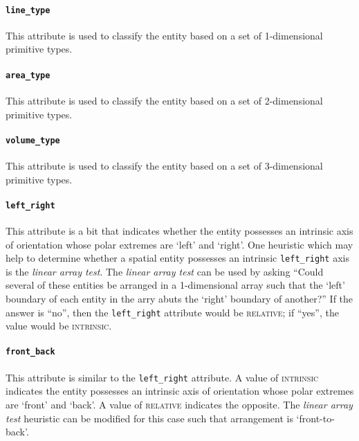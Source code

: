 \documentclass[11pt]{article}
\begin{document}
\paragraph{\texttt{line\_type}} %
\label{par:line_type}
This attribute is used to classify the entity based on a set of 1-dimensional primitive types.

\paragraph{\texttt{area\_type}} %
\label{par:area_type}
This attribute is used to classify the entity based on a set of 2-dimensional primitive types.

\paragraph{\texttt{volume\_type}} %
\label{par:volume_type}
This attribute is used to classify the entity based on a set of 3-dimensional primitive types.

\paragraph{\texttt{left\_right}} %
\label{par:left_right}
This attribute is a bit that indicates whether the entity possesses an intrinsic axis of orientation whose polar extremes are `left' and `right'. One heuristic which may help to determine whether a spatial entity possesses an intrinsic \texttt{left\_right} axis is the \emph{linear array test}. The \emph{linear array test} can be used by asking ``Could several of these entities be arranged in a 1-dimensional array such that the `left' boundary of each entity in the arry abuts the `right' boundary of another?'' If the answer is ``no'', then the \texttt{left\_right} attribute would be \textsc{relative}; if ``yes'', the value would be \textsc{intrinsic}.

\paragraph{\texttt{front\_back}} %
\label{par:front_back}
This attribute is similar to the \texttt{left\_right} attribute. A value of \textsc{intrinsic} indicates the entity possesses an intrinsic axis of orientation whose polar extremes are `front' and `back'. A value of \textsc{relative} indicates the opposite. The \emph{linear array test} heuristic can be modified for this case such that arrangement is `front-to-back'.
\end{document}
